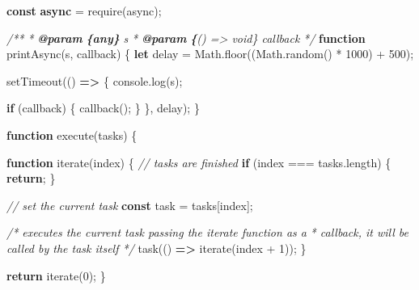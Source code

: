 \documentclass[11pt]{article}
\newenvironment{Shaded}{}{}
\newcommand{\KeywordTok}[1]{\textcolor[rgb]{0.00,0.44,0.13}{\textbf{{#1}}}}
\newcommand{\DecValTok}[1]{\textcolor[rgb]{0.25,0.63,0.44}{{#1}}}
\newcommand{\StringTok}[1]{\textcolor[rgb]{0.25,0.44,0.63}{{#1}}}
\newcommand{\CommentTok}[1]{\textcolor[rgb]{0.38,0.63,0.69}{\textit{{#1}}}}
\newcommand{\FunctionTok}[1]{\textcolor[rgb]{0.02,0.16,0.49}{{#1}}}
\newcommand{\NormalTok}[1]{{#1}}
\newcommand{\AnnotationTok}[1]{\textcolor[rgb]{0.38,0.63,0.69}{\textbf{\textit{{#1}}}}}
\newcommand{\CommentVarTok}[1]{\textcolor[rgb]{0.38,0.63,0.69}{\textbf{\textit{{#1}}}}}
\newcommand{\ControlFlowTok}[1]{\textcolor[rgb]{0.00,0.44,0.13}{\textbf{{#1}}}}
\newcommand{\OperatorTok}[1]{\textcolor[rgb]{0.40,0.40,0.40}{{#1}}}
\newcommand{\BuiltInTok}[1]{{#1}}
\newcommand{\PreprocessorTok}[1]{\textcolor[rgb]{0.74,0.48,0.00}{{#1}}}
\newcommand{\AttributeTok}[1]{\textcolor[rgb]{0.49,0.56,0.16}{{#1}}}
\begin{document}
\begin{Shaded}
\begin{Highlighting}[]
\KeywordTok{const} \KeywordTok{async} \OperatorTok{=} \PreprocessorTok{require}\NormalTok{(}\StringTok{\textquotesingle{}async\textquotesingle{}}\NormalTok{)}\OperatorTok{;}

\CommentTok{/**}
\CommentTok{ * }\AnnotationTok{@param}\CommentTok{ }\CommentVarTok{\{any\}}\CommentTok{ s }
\CommentTok{ * }\AnnotationTok{@param}\CommentTok{ }\CommentVarTok{\{}\CommentTok{() =\textgreater{} void\} callback }
\CommentTok{ */}
\KeywordTok{function} \FunctionTok{printAsync}\NormalTok{(s}\OperatorTok{,}\NormalTok{ callback) \{}
    \KeywordTok{let}\NormalTok{ delay }\OperatorTok{=} \BuiltInTok{Math}\OperatorTok{.}\FunctionTok{floor}\NormalTok{((}\BuiltInTok{Math}\OperatorTok{.}\FunctionTok{random}\NormalTok{() }\OperatorTok{*} \DecValTok{1000}\NormalTok{) }\OperatorTok{+} \DecValTok{500}\NormalTok{)}\OperatorTok{;}

    \PreprocessorTok{setTimeout}\NormalTok{(() }\KeywordTok{=\textgreater{}}\NormalTok{ \{}
        \BuiltInTok{console}\OperatorTok{.}\FunctionTok{log}\NormalTok{(s)}\OperatorTok{;}

        \ControlFlowTok{if}\NormalTok{ (callback) \{}
            \FunctionTok{callback}\NormalTok{()}\OperatorTok{;}
\NormalTok{        \}}
\NormalTok{    \}}\OperatorTok{,}\NormalTok{ delay)}\OperatorTok{;}
\NormalTok{\}}

\KeywordTok{function} \FunctionTok{execute}\NormalTok{(tasks) \{}

    \KeywordTok{function} \FunctionTok{iterate}\NormalTok{(index) \{}
        \CommentTok{// tasks are finished}
        \ControlFlowTok{if}\NormalTok{ (index }\OperatorTok{===}\NormalTok{ tasks}\OperatorTok{.}\AttributeTok{length}\NormalTok{) \{}
            \ControlFlowTok{return}\OperatorTok{;}
\NormalTok{        \}}

        \CommentTok{// set the current task}
        \KeywordTok{const}\NormalTok{ task }\OperatorTok{=}\NormalTok{ tasks[index]}\OperatorTok{;}

        \CommentTok{/* executes the current task passing the \textquotesingle{}iterate\textquotesingle{} function as a}
\CommentTok{         * callback, it will be called by the task itself */}
        \FunctionTok{task}\NormalTok{(() }\KeywordTok{=\textgreater{}} \FunctionTok{iterate}\NormalTok{(index }\OperatorTok{+} \DecValTok{1}\NormalTok{))}\OperatorTok{;}
\NormalTok{    \}}

    \ControlFlowTok{return} \FunctionTok{iterate}\NormalTok{(}\DecValTok{0}\NormalTok{)}\OperatorTok{;}
\NormalTok{\}}


\end{Highlighting}
\end{Shaded}
\end{document}

